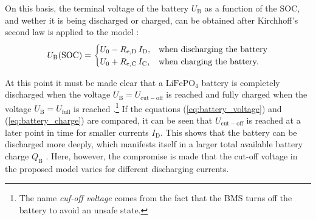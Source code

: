 On this basis, the terminal voltage of the battery $U_\mathrm{B}$ as a function of the SOC, and wether it is being discharged or charged, can be obtained after Kirchhoff's second law is applied to the model \cite{He:2011, Wehbe:2015, Hinz:2019, Saldana:2019}:
	\begin{equation} \label{eq:battery_voltage}
	\centering
		U_\mathrm{B}(\mathrm{SOC}) =
  		\begin{cases}
   			U_0 - R_{\mathrm{e,D}} \, I_\mathrm{D}\text{,} & \text{when discharging the battery} \\
    		U_0 + R_{\mathrm{e,C}} \, I_\mathrm{C}\text{,} & \text{when charging the battery.}
  		\end{cases}
	\end{equation} 
	
At this point it must be made clear that a $\mathrm{LiFePO}_4$ battery is completely discharged when the voltage $U_\mathrm{B} = U_\mathrm{cut-off}$ is reached and fully charged when the voltage $U_\mathrm{B} = U_\mathrm{full}$ is reached \cite{Hinz:2019, Offgridtec:2020}.\footnote{The name \emph{cuf-off voltage} comes from the fact that the BMS turns off the battery to avoid an unsafe state.} If the equations (\ref{eq:battery_voltage}) and (\ref{eq:battery_charge}) are compared, it can be seen that $U_\mathrm{cut-off}$ is reached at a later point in time for smaller currents $I_\mathrm{D}$. This shows that the battery can be discharged more deeply, which manifests itself in a larger total available battery charge $Q_\mathrm{B}$ \cite{Hausmann:2013, Kurzweil:2018}. Here, however, the compromise is made that the cut-off voltage in the proposed model varies for different discharging currents. 

